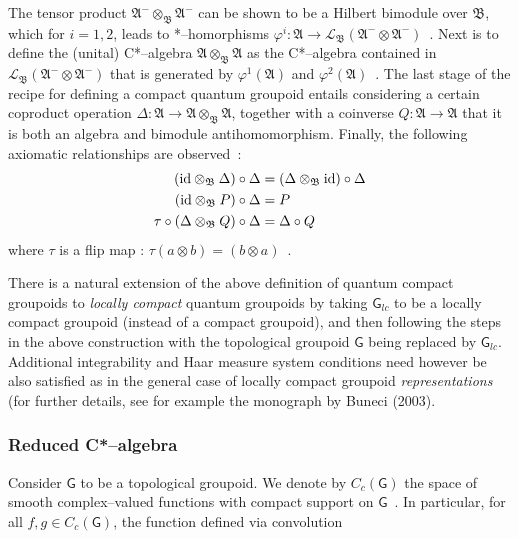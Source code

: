 \documentclass[12pt]{article}
\theoremstyle{plain}
\theoremstyle{definition}
\numberwithin{equation}{section}
\newcommand{\ID}{{\rm id}}
\newcommand{\vp}{\varphi}
\newcommand{\lra}{{\longrightarrow}}
\begin{document}
The tensor product $\mathfrak A^{-} \otimes_{\mathfrak B}\mathfrak
A^{-}$ can be shown to be a Hilbert bimodule over $\mathfrak B$,
which for $i=1,2$, leads to *--homorphisms $\vp^{i} : \mathfrak A
\lra \mathcal L_{\mathfrak B}(\mathfrak A^{-} \otimes \mathfrak
A^{-})$~. Next is to define the (unital) C*--algebra $\mathfrak A
\otimes_{\mathfrak B} \mathfrak A$ as the C*--algebra contained in
$ \mathcal L_{\mathfrak B}(\mathfrak A^{-} \otimes \mathfrak
A^{-})$ that is generated by $\vp^1(\mathfrak A)$ and
$\vp^2(\mathfrak A)$~. The last stage of the recipe for defining a
compact quantum groupoid entails considering a certain coproduct
operation $\Delta : \mathfrak A \lra \mathfrak A
\otimes_{\mathfrak B} \mathfrak A$, together with a coinverse $Q :
\mathfrak A \lra \mathfrak A$ that it is both an algebra and
bimodule antihomomorphism. Finally, the following axiomatic
relationships are observed~:
\begin{equation}
\begin{aligned}
(\ID \otimes_{\mathfrak B} \Delta) \circ \Delta &= (\Delta
\otimes_{\mathfrak B} \ID) \circ \Delta \\ (\ID \otimes_{\mathfrak
B} P) \circ \Delta &= P \\ \tau \circ (\Delta \otimes_{\mathfrak
B} Q) \circ \Delta &= \Delta \circ Q
\end{aligned}
\end{equation}
where $\tau$ is a flip map : $\tau(a \otimes b) = (b \otimes a)$~. 

There is a natural extension of the above definition of quantum compact groupoids
to \textit{locally compact} quantum groupoids by taking $\mathsf{G}_{lc}$ to be a locally compact groupoid (instead of a compact groupoid), and then following the steps in the above construction with the topological groupoid $\mathsf{G}$ being replaced by $\mathsf{G}_{lc}$.  Additional integrability and Haar measure system conditions need however be also satisfied as in the general case of locally compact groupoid \textit{representations} (for further details, see for example the monograph by Buneci (2003).

\subsubsection{Reduced C*--algebra}
Consider $\mathsf{G}$ to be a topological groupoid. We denote by $C_c(\mathsf{G})$ the space of smooth complex--valued functions with compact support on $\mathsf{G}$~. In particular, for all $f,g \in C_c(\mathsf{G})$, the
function defined via convolution
\end{document}
